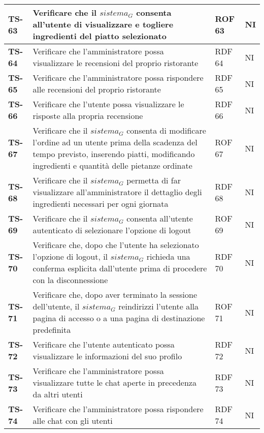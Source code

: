 \begin{longtable}{|>{\centering\arraybackslash}p{1.5cm}|p{12cm}|p{2cm}|p{1cm}|}
  \hline
  \rowcolor{gray!10}
  \textbf{TS-63} & Verificare che il $\textit{sistema}_G$ consenta all'utente di visualizzare e togliere ingredienti del piatto selezionato & ROF 63 & NI \\
  \hline
  \rowcolor{gray!10}
  \textbf{TS-64} & Verificare che l'amministratore possa visualizzare le recensioni del proprio ristorante & RDF 64 & NI \\ 
  \hline
  \rowcolor{gray!10}
  \textbf{TS-65} & Verificare che l'amministratore possa rispondere alle recensioni del proprio ristorante & RDF 65 & NI \\ 
  \hline
  \rowcolor{gray!10}
  \textbf{TS-66} & Verificare che l'utente possa visualizzare le risposte alla propria recensione & RDF 66 & NI \\
  \hline
  \rowcolor{gray!10}
  \textbf{TS-67} & Verificare che il $\textit{sistema}_G$ consenta di modificare l'ordine ad un utente prima della scadenza del tempo previsto, inserendo piatti, modificando ingredienti e quantità delle pietanze ordinate & ROF 67 & NI \\ 
  \hline
  \rowcolor{gray!10}
  \textbf{TS-68} & Verificare che il $\textit{sistema}_G$ permetta di far visualizzare all'amministratore il dettaglio degli ingredienti necessari per ogni giornata & RDF 68 & NI \\ 
  \hline
  \rowcolor{gray!10}
  \textbf{TS-69} & Verificare che il $\textit{sistema}_G$ consenta all'utente autenticato di selezionare l'opzione di logout & ROF 69 & NI \\
  \hline
  \rowcolor{gray!10}
  \textbf{TS-70} & Verificare che, dopo che l'utente ha selezionato l'opzione di logout, il $\textit{sistema}_G$ richieda una conferma esplicita dall'utente prima di procedere con la disconnessione & RDF 70 & NI \\ 
  \hline
  \rowcolor{gray!10}
  \textbf{TS-71} & Verificare che, dopo aver terminato la sessione dell'utente, il $\textit{sistema}_G$ reindirizzi l'utente alla pagina di accesso o a una pagina di destinazione predefinita & ROF 71 & NI \\ 
  \hline
  \rowcolor{gray!10}
  \textbf{TS-72} & Verificare che l'utente autenticato possa visualizzare le informazioni del suo profilo & RDF 72 & NI \\ 
  \hline
  \rowcolor{gray!10}
  \textbf{TS-73} & Verificare che l'amministratore possa visualizzare tutte le chat aperte in precedenza da altri utenti& RDF 73 & NI \\ 
  \hline
  \rowcolor{gray!10}
  \textbf{TS-74} & Verificare che l'amministratore possa rispondere alle chat con gli utenti & RDF 74 & NI \\ 

\end{longtable}
